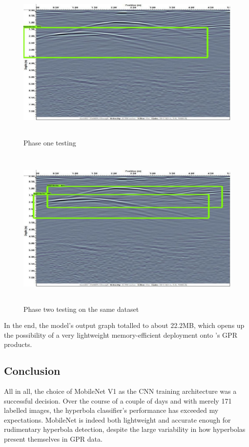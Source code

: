 \documentclass[se,blockletter]{uw-wkrpt}
\begin{document}
\begin{figure}
  \centering
  \includegraphics[height=8cm]{results-step1300}
  \caption{Phase one testing}
  \label{fig:results-step1300}
\end{figure}

\begin{figure}
  \centering
  \includegraphics[height=8cm]{results-step5000}
  \caption{Phase two testing on the same dataset}
  \label{fig:results-step5000}
\end{figure}

In the end, the model's output graph totalled to about 22.2MB, which opens up the possibility of a very lightweight memory-efficient deployment onto \thecompany{}'s GPR products.
\pagebreak
\subsection{Conclusion}
All in all, the choice of MobileNet V1 as the CNN training architecture was a successful decision. Over the course of a couple of days and with merely 171 labelled images, the hyperbola classifier's performance has exceeded my expectations. MobileNet is indeed both lightweight and accurate enough for rudimentary hyperbola detection, despite the large variability in how hyperbolas present themselves in GPR data. 
\end{document}
